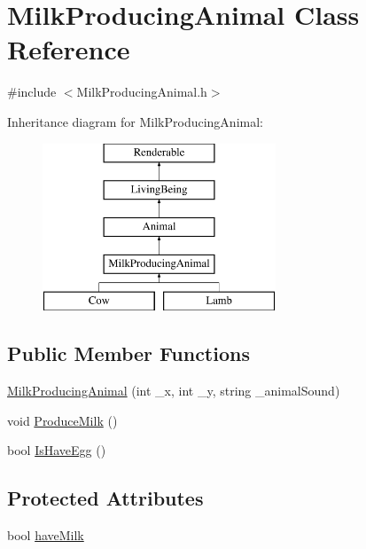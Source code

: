 \hypertarget{classMilkProducingAnimal}{}\section{Milk\+Producing\+Animal Class Reference}
\label{classMilkProducingAnimal}


{\ttfamily \#include $<$Milk\+Producing\+Animal.\+h$>$}

Inheritance diagram for Milk\+Producing\+Animal\+:\begin{figure}[H]
\begin{center}
\leavevmode
\includegraphics[height=5.000000cm]{classMilkProducingAnimal}
\end{center}
\end{figure}
\subsection*{Public Member Functions}
\begin{DoxyCompactItemize}
\item 
\mbox{\hyperlink{classMilkProducingAnimal_ad2c1a8cfaae9486d5f988a862d5af8bd}{Milk\+Producing\+Animal}} (int \+\_\+x, int \+\_\+y, string \+\_\+animal\+Sound)
\item 
void \mbox{\hyperlink{classMilkProducingAnimal_ac3054aafbbda5a31143b060f0d91fd63}{Produce\+Milk}} ()
\item 
bool \mbox{\hyperlink{classMilkProducingAnimal_a8b8c85c702bd68fa97ec61dd054f3456}{Is\+Have\+Egg}} ()
\end{DoxyCompactItemize}
\subsection*{Protected Attributes}
\begin{DoxyCompactItemize}
\item 
bool \mbox{\hyperlink{classMilkProducingAnimal_ad31582ea9ea4eedd26753c1d9a7bbf46}{have\+Milk}}
\end{DoxyCompactItemize}
